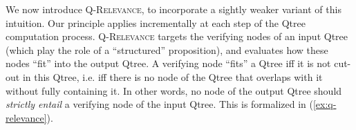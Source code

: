 We now introduce \textsc{Q-Relevance}, to incorporate a sightly weaker variant of this intuition. Our principle applies incrementally at each step of the Qtree computation process. \textsc{Q-Relevance} targets the verifying nodes of an input Qtree (which play the role of a ``structured'' proposition), and evaluates how these nodes ``fit'' into the output Qtree. A verifying node ``fits'' a Qtree iff it is not cut-out in this Qtree, i.e. iff there is no node of the Qtree that overlaps with it without fully containing it. In other words, no node of the output Qtree should \textit{strictly entail} a verifying node of the input Qtree. This is formalized in (\ref{ex:q-relevance}).

\begin{exe}
\label{ex:q-relevance}
\end{exe}


